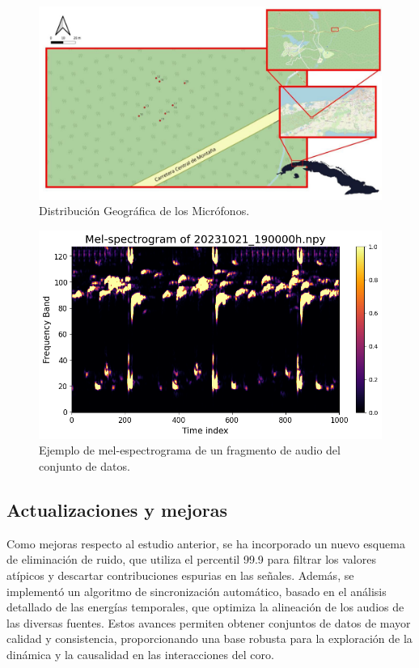 \documentclass[a4paper,10pt,twocolumn]{article}
\begin{document}
\begin{figure}[htbp]
    \centering
    \includegraphics[width=\columnwidth]{assets/mic_map.jpg}
    \caption{Distribución Geográfica de los Micrófonos.}
    \label{fig:mics}
\end{figure}

\begin{figure}[htbp]
    \centering
    \includegraphics[width=\columnwidth]{assets/mel-spectrogram.png}
    \caption{Ejemplo de mel-espectrograma de un fragmento de audio del conjunto de datos.}
    \label{fig:mel}
\end{figure}

\subsection{Actualizaciones y mejoras}

Como mejoras respecto al estudio anterior, se ha incorporado un nuevo esquema de eliminación de ruido, que utiliza el percentil 99.9 para filtrar los valores atípicos y descartar contribuciones espurias en las señales. Además, se implementó un algoritmo de sincronización automático, basado en el análisis detallado de las energías temporales, que optimiza la alineación de los audios de las diversas fuentes. Estos avances permiten obtener conjuntos de datos de mayor calidad y consistencia, proporcionando una base robusta para la exploración de la dinámica y la causalidad en las interacciones del coro.
\end{document}

